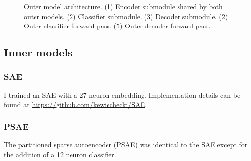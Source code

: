 \begin{figure}
     \begin{subfigure}[b]{0.17\textwidth}
        
         \caption{}
         \label{fig:outerencoder}
     \end{subfigure}
     \hfill
     \begin{subfigure}[b]{0.17\textwidth}
        
         \caption{}
         \label{fig:outerclassifier}
     \end{subfigure}
     \hfill
     \begin{subfigure}[b]{0.17\textwidth}
         
         \caption{}
         \label{fig:outerdecoder}
     \end{subfigure}
    \hfill
     \begin{subfigure}[b]{0.17\textwidth}
         
         \caption{}
         \label{fig:outerenc_inf}
     \end{subfigure}
    \hfill
     \begin{subfigure}[b]{0.17\textwidth}
         
         \caption{}
         \label{fig:outerenc_inf}
     \end{subfigure}
     \caption{Outer model architecture. (\ref{fig:outerencoder}) Encoder submodule shared by both outer models.
     (\ref{fig:outerclassifier}) Classifier submodule.
     (\ref{fig:outerdecoder}) Decoder submodule.
     (\ref{fig:outerclassifier}) Outer classifier forward pass.
     (\ref{fig:outerenc_inf}) Outer decoder forward pass.
     }
     \label{fig:outermodel}
\end{figure}

\subsection{Inner models}
\label{app:inner}

\subsubsection{SAE}
I trained an SAE with a 27 neuron embedding.
Implementation details can be found at 
\url{https://github.com/kewiechecki/SAE}.

\subsubsection{PSAE}
The partitioned sparse autoencoder (PSAE) was identical to the SAE except for the addition of a 12 neuron classifier.

